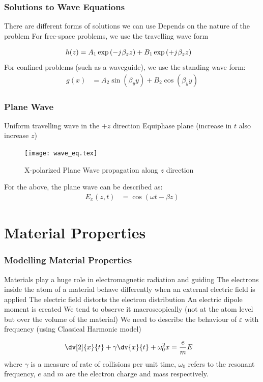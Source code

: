 \documentclass[10pt, compress]{beamer}
\renewcommand{\O}{\omega}  %
\newcommand{\E}{\varepsilon}  %
\renewcommand{\j}{{j}\mkern1mu} %
\begin{document}
  \begin{frame}
  \frametitle{Solutions to Wave Equations}
  \begin{outline}
    \1 There are different forms of solutions we can use
    \2 Depends on the nature of the problem
    \1 For free-space problems, we use the travelling wave form
  \end{outline}
  \begin{align*}
    h(z) &= A_1 \exp \left(-\j \beta_z z \right) + B_1 \exp \left(+\j \beta_z z \right)
  \end{align*}
  For confined problems (such as a waveguide), we use the standing wave form:
  \begin{align*}
    g(x) &= A_2 \sin(\beta_y y) + B_2 \cos(\beta_y y)
  \end{align*}
  \end{frame}


\begin{frame}
  \frametitle{Plane Wave}
        \begin{outline}
        \1 Uniform travelling wave in the $+z$ direction
        \1 Equiphase plane (increase in $t$ also increase $z$)
      \end{outline}
    \begin{figure}[t!]
  \centering
        {\texttt{[image: wave\_eq.tex]}
        \label{fig:EM}}
        \caption{X-polarized Plane Wave propagation along $z$ direction}
      \end{figure}
      For the above, the plane wave can be described as:
      \begin{align*}
        E_x (z,t) &= \cos(\O t - \beta z)
      \end{align*}
\end{frame}
\section{Material Properties}
\begin{frame}
      \frametitle{Modelling Material Properties}
      \begin{outline}
        \1 Materials play a huge role in electromagnetic radiation and guiding
        \1 The electrons inside the atom of a material behave differently when an external electric field is applied
        \2 The electric field distorts the electron distribution
        \2 An electric dipole moment is created
        \1 We tend to observe it macroscopically (not at the atom level but over the volume of the material)
        \1 We need to describe the behaviour of $\E$ with frequency (using Classical Harmonic model)
      \end{outline}
      \begin{align*}
        \dv[2]{x}{t} + \gamma \dv{x}{t} + \O_0^2 x &= \frac{e}{m} E
      \end{align*}
      where $\gamma$ is a measure of rate of collisions per unit time, $\O_0$ refers to the resonant frequency, $e$ and $m$ are the electron charge and mass respectively.
    \end{frame}
\end{document}
